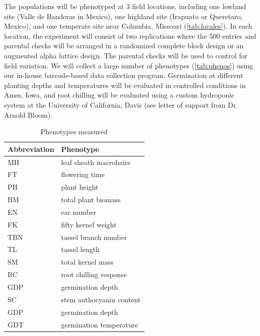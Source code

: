The populations will be phenotyped at 3 field locations, including one lowland site (Valle de Banderas in Mexico), one highland site (Irapuato or Queretaro, Mexico), and one temperate site near Columbia, Missouri (\ref{tab:locales}).  In each location, the experiment will consist of two replications where the 500 entries and parental checks will be arranged in a randomized complete block design or an augmented alpha lattice design. The parental checks will be used to control for field variation.  We will collect a large number of phenotypes (\ref{tab:phenos}) using our in-house barcode-based data collection program. Germination at different planting depths and temperatures will be evaluated in controlled conditions in Ames, Iowa, and root chilling will be evaluated using a custom hydroponic system at the University of California, Davis (see letter of support from Dr. Arnold Bloom).    

\begin{table}
\caption{Phenotypes measured}\label{phenos}
\begin{tabular}{ll}\\\toprule  
{\bf Abbreviation} & {\bf Phenotype}  \\\midrule
MH & leaf sheath macrohairs \\
FT & flowering time \\
PH & plant height \\
BM & total plant biomass \\
EN & ear number \\
FK & fifty kernel weight \\
TBN & tassel branch number \\
TL & tassel length \\
SM & total kernel mass \\
RC & root chilling response \\
GDP & germination depth \\
SC & stem anthocyanin content \\
GDP & germination depth \\
GDT & germination temperature \\\bottomrule
\end{tabular}
\end{table} 

